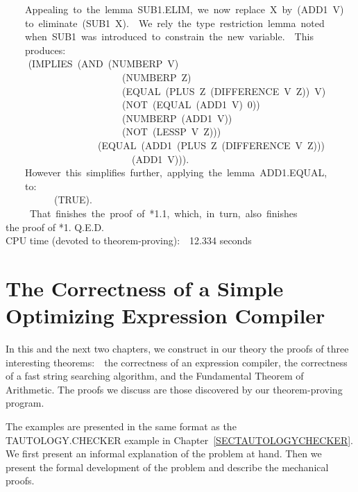 \documentclass[10pt]{book}
\newenvironment{pubasis}{\begin{flushleft}}{\end{flushleft}}
\begin{document}
\begin{pubasis}
~~~~Appealing~to~the~lemma~SUB1.ELIM,~we~now~replace~X~by~(ADD1~V)\\
~~~~to~eliminate~(SUB1~X).~~We~rely~the~type~restriction~lemma~noted\\
~~~~when~SUB1~was~introduced~to~constrain~the~new~variable.~~This\\
~~~~produces:\\

~~	~~(IMPLIES~(AND~(NUMBERP~V)\\
~~~~~~~~~~~~~~~~~~~~~~~~(NUMBERP~Z)\\
~~~~~~~~~~~~~~~~~~~~~~~~(EQUAL~(PLUS~Z~(DIFFERENCE~V~Z))~V)\\
~~~~~~~~~~~~~~~~~~~~~~~~(NOT~(EQUAL~(ADD1~V)~0))\\
~~~~~~~~~~~~~~~~~~~~~~~~(NUMBERP~(ADD1~V))\\
~~~~~~~~~~~~~~~~~~~~~~~~(NOT~(LESSP~V~Z)))\\
~~~~~~~~~~~~~~~~~~~(EQUAL~(ADD1~(PLUS~Z~(DIFFERENCE~V~Z)))\\
~~~~~~~~~~~~~~~~~~~~~~~~~~(ADD1~V))).\\

~~~~However~this~simplifies~further,~applying~the~lemma~ADD1.EQUAL,\\
~~~~to:\\

~~~~~~~~~~(TRUE).\\

~~~~~That~finishes~the~proof~of~*1.1,~which,~in~turn,~also~finishes\\
the proof of *1.  Q.E.D.\\

CPU time (devoted to theorem-proving):~~12.334 seconds\\
\end{pubasis}
\chapter{The Correctness of a Simple Optimizing Expression Compiler}
\pagestyle{headings}
\label{SECCOMPILER}
In this and the next two chapters, we construct in our theory
the proofs of three interesting theorems:~~the correctness of an expression
compiler, the correctness of a fast string searching algorithm, and
the Fundamental Theorem of Arithmetic.  The proofs we discuss are
those discovered by our theorem-proving program.

The examples are presented in the same format as the TAUTOLOGY.CHECKER
example in Chapter~\ref{SECTAUTOLOGYCHECKER}.  We first present an informal explanation
of the problem at hand.  Then we present the formal development of the
problem and describe the mechanical proofs.
\end{document}
